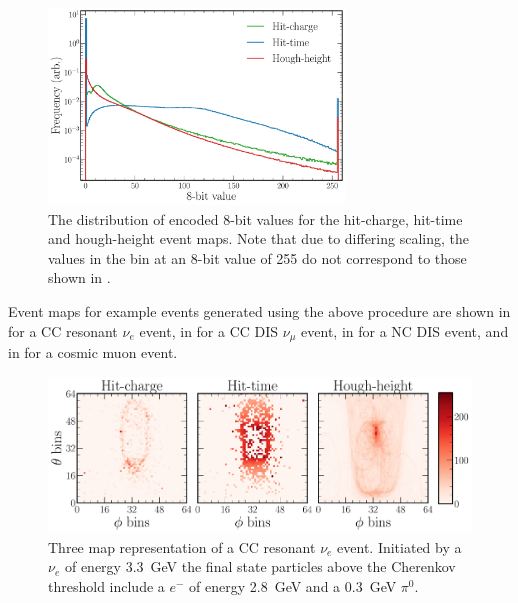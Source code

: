 \begin{figure} %
    \includegraphics[width=0.7\textwidth]{diagrams/7-results/explore_8_bit_range.pdf}
    \caption[Event map encoded 8-bit distributions]
    {The distribution of encoded 8-bit values for the hit-charge, hit-time and hough-height event
        maps. Note that due to differing scaling, the values in the bin at an 8-bit value of 255
        do not correspond to those shown in .}
    \label{fig:explore_8_bit_range}
\end{figure}

Event maps for example events generated using the above procedure are shown in
 for a CC resonant $\nu_{e}$ event, in
 for a CC DIS $\nu_{\mu}$ event, in
 for a NC DIS event, and in
 for a cosmic muon event.

\begin{figure} %
    \includegraphics[width=\textwidth]{diagrams/7-results/explore_nuel_ccres_event.pdf}
    \caption[Example of a CC resonant $\nu_{e}$ event]
    {Three map representation of a CC resonant $\nu_{e}$ event. Initiated by a $\nu_{e}$ of energy
        \SI{3.3}{\GeV} the final state particles above the Cherenkov threshold include a $e^{-}$
        of energy \SI{2.8}{\GeV} and a \SI{0.3}{\GeV} $\pi^{0}$.}
    \label{fig:explore_nuel_ccres_event}
\end{figure}

